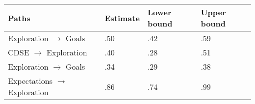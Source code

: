 \begin{table}[ht]
\centering
\begin{tabular}{llll}
  \hline
Paths & Estimate & Lower bound & Upper bound \\ 
  \hline
Exploration $\rightarrow$ Goals & .50 & .42 & .59 \\ 
  CDSE $\rightarrow$ Exploration & .40 & .28 & .51 \\ 
  Exploration $\rightarrow$ Goals & .34 & .29 & .38 \\ 
  Expectations $\rightarrow$ Exploration & .86 & .74 & .99 \\ 
   \hline
\end{tabular}
\end{table}

